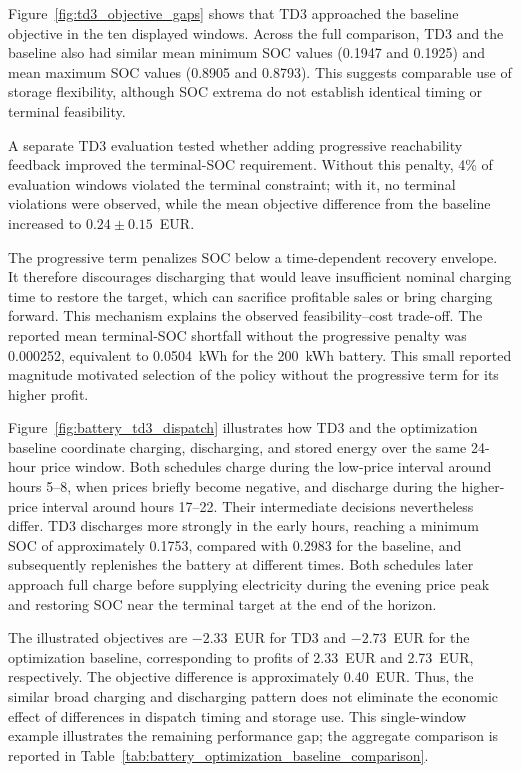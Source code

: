 \documentclass[12pt]{article}
\begin{document}
Figure~\ref{fig:td3_objective_gaps} shows that TD3 approached the baseline objective in the ten displayed windows. Across the full comparison, TD3 and the baseline also had similar mean minimum SOC values (0.1947 and 0.1925) and mean maximum SOC values (0.8905 and 0.8793). This suggests comparable use of storage flexibility, although SOC extrema do not establish identical timing or terminal feasibility.

A separate TD3 evaluation tested whether adding progressive reachability feedback improved the terminal-SOC requirement. Without this penalty, 4\% of evaluation windows violated the terminal constraint; with it, no terminal violations were observed, while the mean objective difference from the baseline increased to $0.24 \pm 0.15$~EUR.

The progressive term penalizes SOC below a time-dependent recovery envelope. It therefore discourages discharging that would leave insufficient nominal charging time to restore the target, which can sacrifice profitable sales or bring charging forward. This mechanism explains the observed feasibility--cost trade-off. The reported mean terminal-SOC shortfall without the progressive penalty was 0.000252, equivalent to 0.0504~kWh for the 200~kWh battery. This small reported magnitude motivated selection of the policy without the progressive term for its higher profit.

Figure~\ref{fig:battery_td3_dispatch} illustrates how TD3 and the optimization baseline coordinate charging, discharging, and stored energy over the same 24-hour price window. Both schedules charge during the low-price interval around hours 5--8, when prices briefly become negative, and discharge during the higher-price interval around hours 17--22. Their intermediate decisions nevertheless differ. TD3 discharges more strongly in the early hours, reaching a minimum SOC of approximately 0.1753, compared with 0.2983 for the baseline, and subsequently replenishes the battery at different times. Both schedules later approach full charge before supplying electricity during the evening price peak and restoring SOC near the terminal target at the end of the horizon.

The illustrated objectives are $-2.33$~EUR for TD3 and $-2.73$~EUR for the optimization baseline, corresponding to profits of 2.33~EUR and 2.73~EUR, respectively. The objective difference is approximately 0.40~EUR. Thus, the similar broad charging and discharging pattern does not eliminate the economic effect of differences in dispatch timing and storage use. This single-window example illustrates the remaining performance gap; the aggregate comparison is reported in Table~\ref{tab:battery_optimization_baseline_comparison}.
\end{document}
